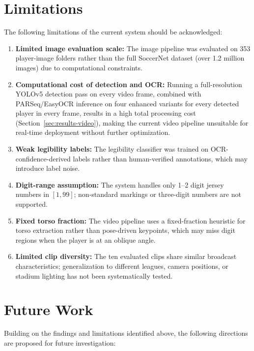 \section{Limitations}

The following limitations of the current system should be acknowledged:

\begin{enumerate}[noitemsep]
    \item \textbf{Limited image evaluation scale:} The image pipeline
    was evaluated on 353 player-image folders rather than the full
    SoccerNet dataset (over 1.2 million images) due to computational
    constraints.
    \item \textbf{Computational cost of detection and OCR:} Running a
    full-resolution YOLOv5 detection pass on every video frame, combined
    with PARSeq/EasyOCR inference on four enhanced variants for every
    detected player in every frame, results in a high total processing
    cost (Section~\ref{sec:results-video}), making the current video
    pipeline unsuitable for real-time deployment without further
    optimization.
    \item \textbf{Weak legibility labels:} The legibility classifier was
    trained on OCR-confidence-derived labels rather than human-verified
    annotations, which may introduce label noise.
    \item \textbf{Digit-range assumption:} The system handles only
    1--2 digit jersey numbers in $[1, 99]$; non-standard markings or
    three-digit numbers are not supported.
    \item \textbf{Fixed torso fraction:} The video pipeline uses a
    fixed-fraction heuristic for torso extraction rather than
    pose-driven keypoints, which may miss digit regions when the player
    is at an oblique angle.
    \item \textbf{Limited clip diversity:} The ten evaluated clips
    share similar broadcast characteristics; generalization to different
    leagues, camera positions, or stadium lighting has not been
    systematically tested.
\end{enumerate}

\section{Future Work}

Building on the findings and limitations identified above, the following
directions are proposed for future investigation:

